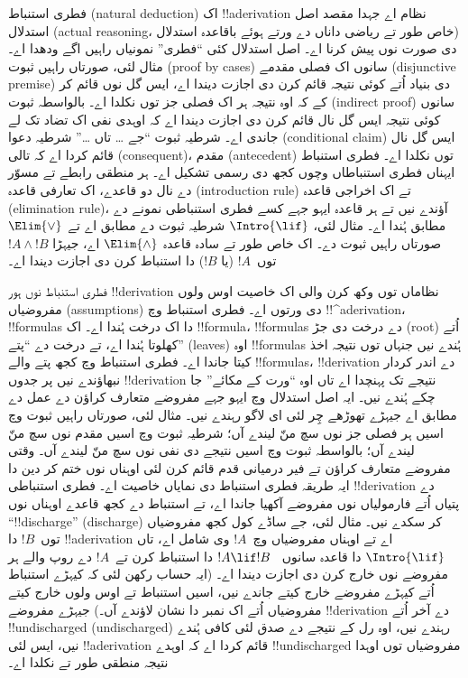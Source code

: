 \documentclass[../../../include/open-logic-section]{subfiles}
\begin{document}
      {}
      {}


فطری استنباط (natural deduction) اک !!a{derivation} نظام اے جہدا مقصد
اصل استدلال (actual reasoning، خاص طور تے ریاضی داناں دے ورتے ہوئے
باقاعدہ استدلال) دی صورت نوں پیش کرنا اے۔
اصل استدلال کئی ``فطری'' نمونیاں راہیں اگے ودھدا اے۔ مثال لئی، صورتاں
راہیں ثبوت (proof by cases) سانوں اک فصلی مقدمے (disjunctive premise)
دی بنیاد اُتے کوئی نتیجہ قائم کرن دی
اجازت دیندا اے، ایس گل نوں قائم کر کے کہ اوہ نتیجہ ہر اک فصلی جز توں
نکلدا اے۔ بالواسطہ ثبوت (indirect proof) سانوں کوئی نتیجہ ایس گل نال
قائم کرن دی اجازت
دیندا اے کہ اوہدی نفی اک تضاد تک لے جاندی اے۔ شرطیہ ثبوت ``جے \dots
تاں \dots'' شرطیہ دعوا (conditional claim) ایس گل نال قائم کردا اے کہ
تالی (consequent)، مقدم (antecedent) توں نکلدا اے۔ فطری استنباط ایہناں
فطری استنباطاں وچوں کجھ دی رسمی تشکیل اے۔ ہر منطقی رابطے تے مسوّر دے
نال دو قاعدے، اک تعارفی قاعدہ (introduction rule) تے اک اخراجی قاعدہ
(elimination rule)، آؤندے
نیں تے ہر قاعدہ ایہو جہے کسے فطری استنباطی نمونے دے مطابق ہُندا اے۔
مثال لئی، $\Intro{\lif}$ شرطیہ ثبوت دے مطابق اے تے $\Elim{\lor}$
صورتاں راہیں ثبوت دے۔ اک خاص طور تے سادہ قاعدہ $\Elim{\land}$ اے،
جیہڑا $!A \land !B$ توں~$!A$ (یا $!B$) دا استنباط کرن دی اجازت دیندا
اے۔

فطری استنباط نوں ہور !!{derivation} نظاماں توں وکھ کرن والی اک خاصیت
اوس ولوں مفروضیاں (assumptions) دی ورتوں اے۔ فطری استنباط وچ
!!^a{derivation}،
!!{formula}s دا اک درخت ہُندا اے۔ اک !!{formula}، !!{formula}s دے درخت
دی جڑ (root) اُتے کھلوتا ہُندا اے، تے درخت دے ``پتے'' (leaves) اوہ
!!{formula}s ہُندے
نیں جنہاں توں نتیجہ اخذ کیتا جاندا اے۔ فطری استنباط وچ کجھ پتے والے
!!{formula}s، !!{derivation} دے اندر کردار نبھاؤندے نیں پر جدوں
!!{derivation} نتیجے تک پہنچدا اے تاں اوہ ``ورت کے مکائے'' جا چکے ہُندے
نیں۔ ایہ اصل استدلال وچ ایہو جہے مفروضے متعارف کراؤن دے عمل دے مطابق
اے جیہڑے تھوڑھے چِر لئی ای لاگو رہندے نیں۔ مثال لئی، صورتاں راہیں ثبوت
وچ اسیں ہر فصلی جز نوں سچ منّ لیندے آں؛ شرطیہ ثبوت وچ اسیں مقدم نوں
سچ منّ لیندے آں؛ بالواسطہ ثبوت وچ اسیں نتیجے دی نفی نوں سچ منّ لیندے
آں۔ وقتی مفروضے متعارف کراؤن تے فیر درمیانی قدم قائم کرن لئی اوہناں
نوں ختم کر دین دا ایہ طریقہ فطری استنباط دی نمایاں خاصیت اے۔ فطری
استنباطی !!{derivation} دے پتیاں اُتے فارمولیاں نوں مفروضے آکھیا جاندا
اے، تے استنباط دے کجھ قاعدے اوہناں نوں ``!!{discharge}'' (discharge)
کر سکدے نیں۔
مثال لئی، جے ساڈے کول کجھ مفروضیاں توں~$!B$ دا !!a{derivation} اے تے
اوہناں مفروضیاں وچ~$!A$ وی شامل اے، تاں $\Intro{\lif}$ دا قاعدہ سانوں
~$!A \lif !B$ دا استنباط کرن تے~$!A$ دے روپ والے ہر مفروضے نوں
خارج کرن دی اجازت دیندا اے۔ (ایہ حساب رکھن لئی کہ کیہڑے
استنباط اُتے کیہڑے مفروضے خارج کیتے جاندے نیں، اسیں استنباط
تے اوس ولوں خارج کیتے مفروضیاں اُتے اک نمبر دا نشان لاؤندے
آں۔) جیہڑے مفروضے !!{derivation} دے آخر اُتے !!{undischarged}
(undischarged) رہندے
نیں، اوہ رل کے نتیجے دے صدق لئی کافی ہُندے نیں، ایس لئی
!!a{derivation} قائم کردا اے کہ اوہدے !!{undischarged} مفروضیاں توں
اوہدا نتیجہ منطقی طور تے نکلدا اے۔
\end{document}
